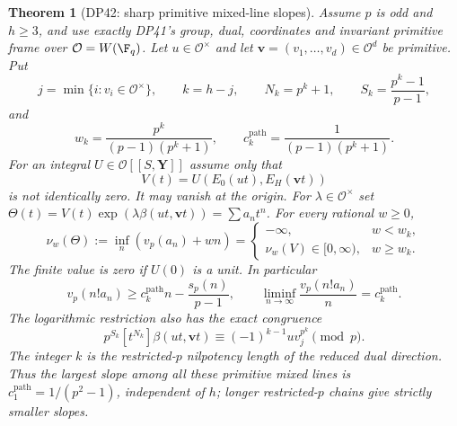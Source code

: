 \documentclass[11pt,a4paper]{article}
\newtheorem{theorem}{Theorem}[section]
\theoremstyle{definition}\newtheorem{remark}[theorem]{Remark}
\newcommand{\vp}{v_p}\newcommand{\dR}{\mathrm{dR}}\newcommand{\crys}{\mathrm{crys}}
\begin{document}
\begin{theorem}[DP42: sharp primitive mixed-line slopes]\label{DP42}
Assume $p$ is odd and $h\ge3$, and use exactly DP41's group, dual, coordinates and invariant primitive frame over $\mathcal O=W(\F_q)$. Let $u\in\mathcal O^\times$ and let $\mathbf v=(v_1,\ldots,v_d)\in\mathcal O^d$ be primitive. Put
\[
 j=\min\{i:v_i\in\mathcal O^\times\},\qquad k=h-j,\qquad
 N_k=p^k+1,\qquad S_k=\frac{p^k-1}{p-1},
\]
and
\[
 w_k=\frac{p^k}{(p-1)(p^k+1)},\qquad
 c_k^{\mathrm{path}}=\frac1{(p-1)(p^k+1)}.
\]
For an integral $U\in\mathcal O[[S,\mathbf Y]]$ assume only that
\[
 V(t)=U(E_0(ut),E_H(\mathbf vt))
\]
is not identically zero. It may vanish at the origin. For $\lambda\in\mathcal O^\times$ set
$\Theta(t)=V(t)\exp(\lambda\beta(ut,\mathbf vt))=\sum a_nt^n$.
For every rational $w\ge0$,
\[
 \nu_w(\Theta):=\inf_n(\vp(a_n)+wn)=
 \begin{cases}
 -\infty,&w<w_k,\\
 \nu_w(V)\in[0,\infty),&w\ge w_k.
 \end{cases}
\]
The finite value is zero if $U(0)$ is a unit. In particular
\begin{equation}\label{eq:pathsharp}
 \vp(n!a_n)\ge c_k^{\mathrm{path}}n-\frac{s_p(n)}{p-1},
 \qquad
 \liminf_{n\to\infty}\frac{\vp(n!a_n)}n=c_k^{\mathrm{path}}.
\end{equation}
The logarithmic restriction also has the exact congruence
\begin{equation}\label{eq:pathcoefficient}
 p^{S_k}[t^{N_k}]\beta(ut,\mathbf vt)
       \equiv(-1)^{k-1}u v_j^{p^k}\pmod p.
\end{equation}
The integer $k$ is the restricted-$p$ nilpotency length of the reduced dual direction. Thus the largest slope among all these primitive mixed lines is
$c_1^{\mathrm{path}}=1/(p^2-1)$, independent of $h$; longer restricted-$p$ chains give strictly smaller slopes.
\end{theorem}
\end{document}
